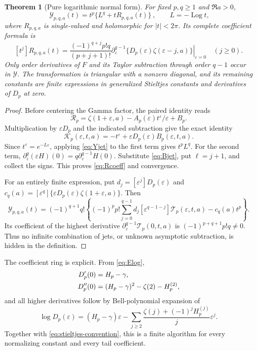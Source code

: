 \documentclass[11pt,a4paper]{article}
\numberwithin{equation}{section}
\newtheorem{theorem}{Theorem}[section]
\theoremstyle{definition}
\theoremstyle{remark}
\DeclareMathOperator{\Log}{Log}
\newcommand{\eps}{\varepsilon}
\newcommand{\cR}{\mathcal R}
\newcommand{\cY}{\mathcal Y}
\newcommand{\cT}{\mathcal T}
\newcommand{\cK}{\mathcal K}
\begin{document}
\begin{theorem}[Pure logarithmic normal form]\label{thm:purejet}
For fixed $p,q\ge1$ and $\Re a>0$,
\begin{equation}\label{eq:purejet}
 \boxed{\ \cY_{p,q,a}(t)=t^p\{L^q+tR_{p,q,a}(t)\}\ },
 \qquad L=-\Log t,
\end{equation}
where $R_{p,q,a}$ is single-valued and holomorphic for $|t|<2\pi$.
Its complete coefficient formula is
\begin{equation}\label{eq:Rcoeff}
 [t^j]R_{p,q,a}(t)=
 \frac{(-1)^{q+j}p!q}{(p+j+1)!}
 \left.\partial_\eps^{q-1}
       \{D_p(\eps)\zeta(\eps-j,a)\}\right|_{\eps=0}
 \quad(j\ge0).
\end{equation}
Only order derivatives of $F$ and its Taylor subtraction through order
$q-1$ occur in $\cY$. The transformation is triangular with a nonzero
diagonal, and its remaining constants are finite expressions in
generalized Stieltjes constants and derivatives of $D_p$ at zero.
\end{theorem}
\begin{proof}
Before centering the Gamma factor, the paired identity reads
\[
 \cR_p=\zeta(1+\eps,a)-A_p(\eps)t^\eps/\eps+B_p.
\]
Multiplication by $\eps D_p$ and the indicated subtraction give the
exact identity
\begin{equation}\label{eq:Kexact}
 \cK_p(\eps,t,a)=-t^\eps+\eps D_p(\eps)B_p(\eps,t,a).
\end{equation}
Since $t^\eps=e^{-L\eps}$, applying \eqref{eq:Yjet} to the first
term gives $t^pL^q$. For the second term,
$\partial_\eps^q(\eps H)(0)=q\partial_\eps^{q-1}H(0)$.
Substitute \eqref{eq:Bjet}, put $\ell=j+1$, and collect the signs.
This proves \eqref{eq:Rcoeff} and convergence.

For an entirely finite expression, put
$d_j=[\eps^j]D_p(\eps)$ and
$c_q(a)=[\eps^q]\{\eps D_p(\eps)\zeta(1+\eps,a)\}$.
Then
\begin{equation}\label{eq:finite-triangular}
 \cY_{p,q,a}(t)=(-1)^{q+1}q!
 \left\{(-1)^pp!\sum_{j=0}^{q-1}d_j
       [\eps^{q-1-j}]\cT_p(\eps,t,a)-c_q(a)t^p\right\}.
\end{equation}
Its coefficient of the highest derivative
$\partial_\eps^{q-1}\cT_p(0,t,a)$ is
$(-1)^{p+q+1}p!q\ne0$. Thus no infinite combination of jets, or
unknown asymptotic subtraction, is hidden in the definition.
\end{proof}

The coefficient ring is explicit. From \eqref{eq:Elog},
\begin{align}
 D_p'(0)&=H_p-\gamma,\label{eq:Dsmall}\\
 D_p''(0)&=(H_p-\gamma)^2-\zeta(2)-H_p^{(2)},\notag
\end{align}
and all higher derivatives follow by Bell-polynomial expansion of
\[
 \log D_p(\eps)=(H_p-\gamma)\eps-
   \sum_{j\ge2}\frac{\zeta(j)+(-1)^jH_p^{(j)}}j\eps^j.
\]
Together with \eqref{eq:stieltjes-convention}, this is a finite
algorithm for every normalizing constant and every tail coefficient.
\end{document}

